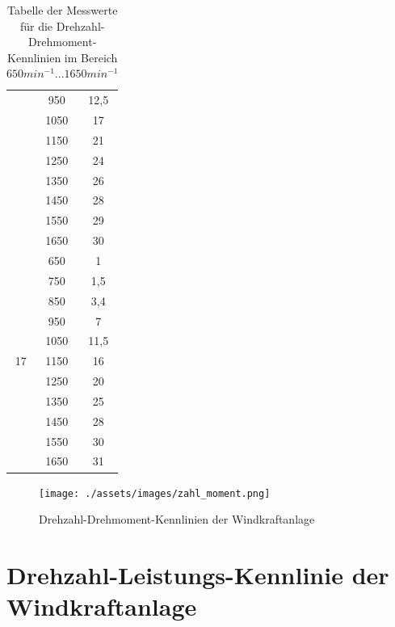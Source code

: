 \documentclass{report}
\begin{document}
\begin{table}[]
\begin{tabular}{|c|c|c|}
                     & 950      & 12,5       \\ \cline{2-4}
                     & 1050     & 17         \\ \cline{2-4}
                     & 1150     & 21         \\ \cline{2-4}
                     & 1250     & 24         \\ \cline{2-4}
                     & 1350     & 26         \\ \cline{2-4}
                     & 1450     & 28         \\ \cline{2-4}
                     & 1550     & 29         \\ \cline{2-4}
                     & 1650     & 30 \\ \hline
\multirow{11}{*}{17} & 650      & 1          \\ \cline{2-4}
                     & 750      & 1,5        \\ \cline{2-4}
                     & 850      & 3,4        \\ \cline{2-4}
                     & 950      & 7          \\ \cline{2-4}
                     & 1050     & 11,5       \\ \cline{2-4}
                     & 1150     & 16         \\ \cline{2-4}
                     & 1250     & 20         \\ \cline{2-4}
                     & 1350     & 25         \\ \cline{2-4}
                     & 1450     & 28         \\ \cline{2-4}
                     & 1550     & 30         \\ \cline{2-4}
                     & 1650     & 31 		\\\hline
\end{tabular}
\caption{Tabelle der Messwerte für die Drehzahl-Drehmoment-Kennlinien im Bereich $650min^{-1}...1650min^{-1}$}
\label{tab:drehzahl_drehmoment}
\end{table}

\begin{figure}[!ht]
	\centering
	\texttt{[image: ./assets/images/zahl\_moment.png]}
	\caption{Drehzahl-Drehmoment-Kennlinien der Windkraftanlage}
	\label{fig:zahl_moment}
\end{figure}

\section{Drehzahl-Leistungs-Kennlinie der Windkraftanlage}
\end{document}
